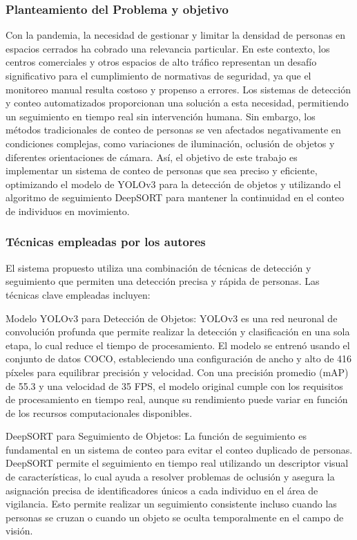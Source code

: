 \subsubsection{Planteamiento del Problema y objetivo }
Con la pandemia, la necesidad de gestionar y limitar la densidad de personas en espacios cerrados ha cobrado una relevancia particular. En este contexto, los centros comerciales y otros espacios de alto tráfico representan un desafío significativo para el cumplimiento de normativas de seguridad, ya que el monitoreo manual resulta costoso y propenso a errores. Los sistemas de detección y conteo automatizados proporcionan una solución a esta necesidad, permitiendo un seguimiento en tiempo real sin intervención humana. Sin embargo, los métodos tradicionales de conteo de personas se ven afectados negativamente en condiciones complejas, como variaciones de iluminación, oclusión de objetos y diferentes orientaciones de cámara. Así, el objetivo de este trabajo es implementar un sistema de conteo de personas que sea preciso y eficiente, optimizando el modelo de YOLOv3 para la detección de objetos y utilizando el algoritmo de seguimiento DeepSORT para mantener la continuidad en el conteo de individuos en movimiento.

\subsubsection{Técnicas empleadas por los autores}
El sistema propuesto utiliza una combinación de técnicas de detección y seguimiento que permiten una detección precisa y rápida de personas. Las técnicas clave empleadas incluyen:

Modelo YOLOv3 para Detección de Objetos: YOLOv3 es una red neuronal de convolución profunda que permite realizar la detección y clasificación en una sola etapa, lo cual reduce el tiempo de procesamiento. El modelo se entrenó usando el conjunto de datos COCO, estableciendo una configuración de ancho y alto de 416 píxeles para equilibrar precisión y velocidad. Con una precisión promedio (mAP) de 55.3 y una velocidad de 35 FPS, el modelo original cumple con los requisitos de procesamiento en tiempo real, aunque su rendimiento puede variar en función de los recursos computacionales disponibles.

DeepSORT para Seguimiento de Objetos: La función de seguimiento es fundamental en un sistema de conteo para evitar el conteo duplicado de personas. DeepSORT permite el seguimiento en tiempo real utilizando un descriptor visual de características, lo cual ayuda a resolver problemas de oclusión y asegura la asignación precisa de identificadores únicos a cada individuo en el área de vigilancia. Esto permite realizar un seguimiento consistente incluso cuando las personas se cruzan o cuando un objeto se oculta temporalmente en el campo de visión.

